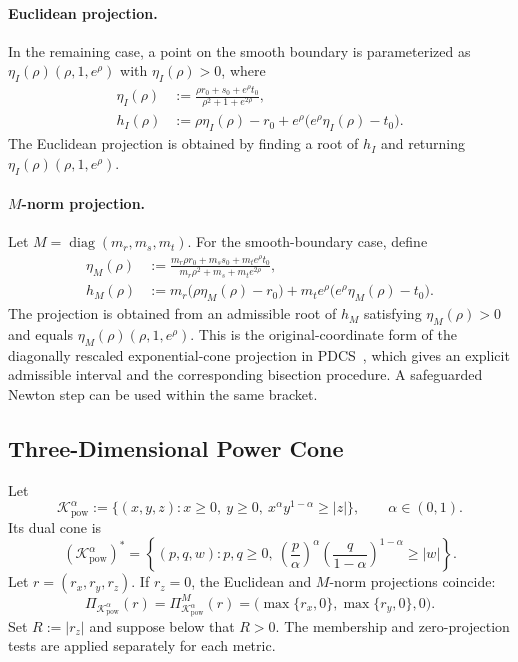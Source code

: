 \documentclass[letterpaper]{article} %
\theoremstyle{definition}
\theoremstyle{remark}
\begin{document}
\paragraph{Euclidean projection.}
In the remaining case, a point on the smooth boundary is parameterized as
$\eta_I(\rho)(\rho,1,e^\rho)$ with $\eta_I(\rho)>0$, where
\begin{equation}
\label{eq:exp-euclidean-projection}
\begin{aligned}
    \eta_I(\rho)
    &:={
    \frac{\rho r_0+s_0+e^\rho t_0}
         {\rho^2+1+e^{2\rho}}},\\
    h_I(\rho)
    &:={\rho\eta_I(\rho)-r_0
      +e^\rho\bigl(e^\rho\eta_I(\rho)-t_0\bigr)}.
\end{aligned}
\end{equation}
The Euclidean projection is obtained by finding a root of $h_I$ and returning
$\eta_I(\rho)(\rho,1,e^\rho)$.

\paragraph{\texorpdfstring{$M$}{M}-norm projection.}
Let $M=\operatorname{diag}(m_r,m_s,m_t)$. For the smooth-boundary case, define
\begin{equation}
\label{eq:exp-metric-projection}
\begin{aligned}
    \eta_M(\rho)
    &:={
    \frac{m_r\rho r_0+m_ss_0+m_te^\rho t_0}
         {m_r\rho^2+m_s+m_te^{2\rho}}},\\
    h_M(\rho)
    &:={m_r\bigl(\rho\eta_M(\rho)-r_0\bigr)
      +m_te^\rho\bigl(e^\rho\eta_M(\rho)-t_0\bigr)}.
\end{aligned}
\end{equation}
The projection is obtained from an admissible root of $h_M$ satisfying
$\eta_M(\rho)>0$ and equals $\eta_M(\rho)(\rho,1,e^\rho)$. This is the
original-coordinate form of the diagonally rescaled exponential-cone
projection in PDCS~\cite{lin2025pdcs}, which gives an explicit admissible
interval and the corresponding bisection procedure. A safeguarded Newton step
can be used within the same bracket.

\subsection{Three-Dimensional Power Cone}

Let
\[
    \mathcal K_{\mathrm{pow}}^\alpha
    :=\{(x,y,z):x\ge0,\ y\ge0,\ x^\alpha y^{1-\alpha}\ge |z|\},
    \qquad \alpha\in(0,1).
\]
Its dual cone is
\[
    (\mathcal K_{\mathrm{pow}}^\alpha)^*
    =\left\{(p,q,w):p,q\ge0,\
    \left(\frac{p}{\alpha}\right)^\alpha
    \left(\frac{q}{1-\alpha}\right)^{1-\alpha}\ge |w|\right\}.
\]
Let $r=(r_x,r_y,r_z)$. If $r_z=0$, the Euclidean and $M$-norm projections
coincide:
\[
    \Pi_{\mathcal K_{\mathrm{pow}}^\alpha}(r)
    =\Pi_{\mathcal K_{\mathrm{pow}}^\alpha}^{M}(r)
    =\bigl(\max\{r_x,0\},\max\{r_y,0\},0\bigr).
\]
Set $R:=|r_z|$ and suppose below that $R>0$. The membership and
zero-projection tests are applied separately for each metric.
\end{document}
